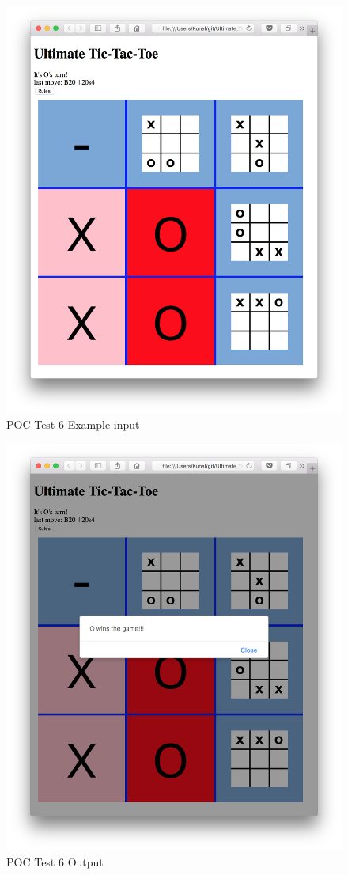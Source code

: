 \documentclass[12pt, titlepage]{article}
\begin{document}
\begin{figure}
  \includegraphics[width=\linewidth]{Figures/Test6-input.png}
  \caption{POC Test 6 Example input}
  \label{fig:Test6_input}
\end{figure}

\begin{figure}
  \includegraphics[width=\linewidth]{Figures/Test6-output.png}
  \caption{POC Test 6 Output}
  \label{fig:Test6_output}
\end{figure}
\end{document}
